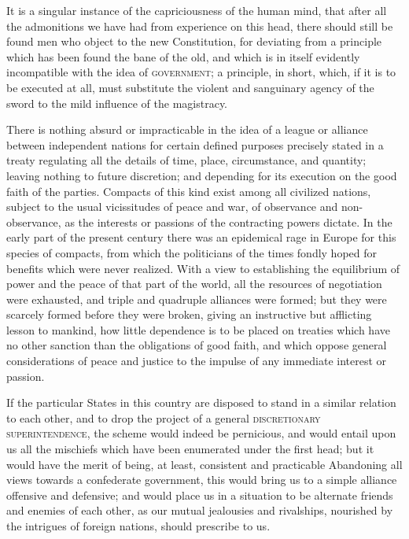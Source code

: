 It is a singular instance of the capriciousness of the human mind, that after all the admonitions we have had from experience on this head, there should still be found men who object to the new Constitution, for deviating from a principle which has been found the bane of the old, and which is in itself evidently incompatible with the idea of \textsc{government}; a principle, in short, which, if it is to be executed at all, must substitute the violent and sanguinary agency of the sword to the mild influence of the magistracy.

There is nothing absurd or impracticable in the idea of a league or alliance between independent nations for certain defined purposes precisely stated in a treaty regulating all the details of time, place, circumstance, and quantity; leaving nothing to future discretion; and depending for its execution on the good faith of the parties. 
Compacts of this kind exist among all civilized nations, subject to the usual vicissitudes of peace and war, of observance and non-observance, as the interests or passions of the contracting powers dictate. 
In the early part of the present century there was an epidemical rage in Europe for this species of compacts, from which the politicians of the times fondly hoped for benefits which were never realized. 
With a view to establishing the equilibrium of power and the peace of that part of the world, all the resources of negotiation were exhausted, and triple and quadruple alliances were formed; but they were scarcely formed before they were broken, giving an instructive but afflicting lesson to mankind, how little dependence is to be placed on treaties which have no other sanction than the obligations of good faith, and which oppose general considerations of peace and justice to the impulse of any immediate interest or passion.

If the particular States in this country are disposed to stand in a similar relation to each other, and to drop the project of a general \textsc{discretionary superintendence}, the scheme would indeed be pernicious, and would entail upon us all the mischiefs which have been enumerated under the first head; but it would have the merit of being, at least, consistent and practicable Abandoning all views towards a confederate government, this would bring us to a simple alliance offensive and defensive; and would place us in a situation to be alternate friends and enemies of each other, as our mutual jealousies and rivalships, nourished by the intrigues of foreign nations, should prescribe to us.

